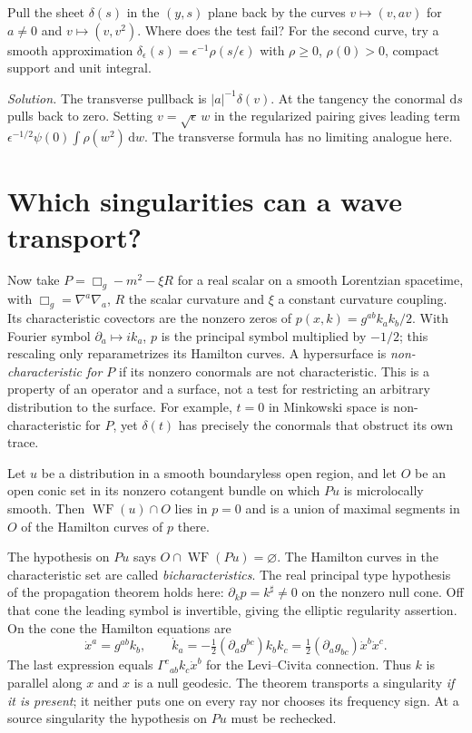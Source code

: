 \begin{exercise}
Pull the sheet $\delta(s)$ in the $(y,s)$ plane back by the curves
$v\mapsto(v,av)$ for $a\ne0$ and $v\mapsto(v,v^2)$. Where does the test
fail? For the second curve, try a smooth approximation
$\delta_\epsilon(s)=\epsilon^{-1}\rho(s/\epsilon)$ with $\rho\ge0$,
$\rho(0)>0$, compact support and unit integral.
\end{exercise}
\noindent\emph{Solution.} The transverse pullback is
$|a|^{-1}\delta(v)$. At the tangency the conormal $\mathrm{d}s$ pulls
back to zero. Setting $v=\sqrt\epsilon\,w$ in the regularized pairing
gives leading term $\epsilon^{-1/2}\psi(0)\int\rho(w^2)\,\mathrm{d}w$.
The transverse formula has no limiting analogue here.

\section{Which singularities can a wave transport?}
Now take $P=\Box_g-m^2-\xi R$ for a real scalar on a smooth Lorentzian
spacetime, with $\Box_g=\nabla^a\nabla_a$, $R$ the scalar curvature and
$\xi$ a constant curvature coupling. Its characteristic covectors are the
nonzero zeros of
$p(x,k)=g^{ab}k_a k_b/2$. With Fourier symbol $\partial_a\mapsto ik_a$,
$p$ is the principal symbol multiplied by $-1/2$; this rescaling only
reparametrizes its Hamilton curves. A hypersurface is
\emph{non-characteristic for $P$} if its nonzero conormals are not
characteristic. This is a property of an operator and a surface, not a
test for restricting an arbitrary distribution to the surface. For
example, $t=0$ in Minkowski space is non-characteristic for $P$, yet
$\delta(t)$ has precisely the conormals that obstruct its own trace.

\begin{theorem}
\label{f:wf-propagation}
Let $u$ be a distribution in a smooth boundaryless open region, and
let $O$ be an open conic set in its nonzero cotangent bundle on which
$Pu$ is microlocally smooth. Then $\operatorname{WF}(u)\cap O$ lies in
$p=0$ and is a union of maximal segments in $O$ of the Hamilton curves
of $p$ there.
\end{theorem}

The hypothesis on $Pu$ says $O\cap\operatorname{WF}(Pu)=\varnothing$.
The Hamilton curves in the characteristic set are called
\emph{bicharacteristics}. The real principal type hypothesis of the
propagation theorem holds here: $\partial_k p=k^\sharp\ne0$ on the
nonzero null cone. Off that cone the leading symbol is invertible, giving
the elliptic regularity assertion. On the cone the Hamilton equations are
\[
 \dot x^a=g^{ab}k_b,\qquad
 \dot k_a=-\tfrac12(\partial_a g^{bc})k_b k_c
          =\tfrac12(\partial_a g_{bc})\dot x^b\dot x^c .
\]
The last expression equals $\Gamma^c{}_{ab}k_c\dot x^b$ for the
Levi--Civita connection. Thus $k$ is parallel along $x$ and $x$ is a
null geodesic. The theorem transports a singularity \emph{if it is
present}; it neither puts one on every ray nor chooses its frequency
sign. At a source singularity the hypothesis on $Pu$ must be rechecked.

